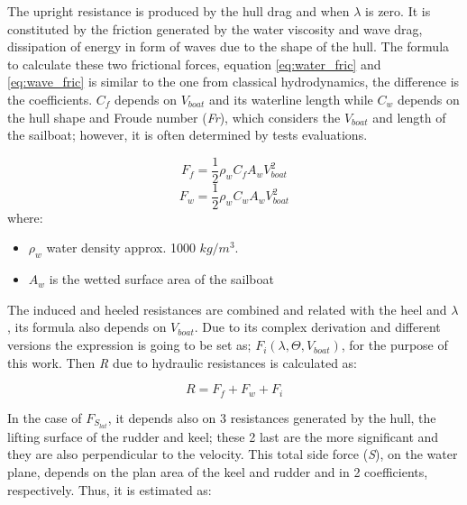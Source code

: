 The upright resistance is produced by the hull drag and when $\lambda$ is zero. It is constituted by the friction generated by the water viscosity and wave drag, dissipation of energy in form of waves due to the shape of the hull. The formula to calculate these two frictional forces, equation \ref{eq:water_fric} and \ref{eq:wave_fric} is similar to the one from classical hydrodynamics, the difference is the coefficients. $C_{f}$ depends on $V_{boat}$ and its waterline length while $C_{w}$ depends on the hull shape and Froude number (\textit{Fr}), which considers the $V_{boat}$ and length of the sailboat; however, it is often determined by tests evaluations.

\begin{equation}\label{eq:water_fric}
 F_{f}=\frac{1}{2}\rho_{w} C_{f} A_{w} V_{boat}^2
\end{equation}
\begin{equation}\label{eq:wave_fric}
 F_{w}=\frac{1}{2}\rho_{w} C_{w} A_{w} V_{boat}^2
\end{equation}
where:
\begin{itemize} \label{R_symbols}
    \item $\rho_{w}$ water density approx. 1000 $kg/m^3$.
    \item $A_{w}$ is the wetted surface area of the sailboat
\end{itemize}

The induced and heeled resistances are combined and related with the heel and $\lambda$, its formula also depends on $V_{boat}$. Due to its complex derivation and different versions the expression is going to be set as; $F_{i}(\lambda,\Theta,V_{boat})$, for the purpose of this work. Then \textit{R} due to hydraulic resistances is calculated as: \par 
\begin{equation} \label{eq:R_total}
    R=F_{f}+F_{w}+F_{i}
\end{equation}


In the case of $F_{S_{lat}}$, it depends also on 3 resistances generated by the hull, the lifting surface of the rudder and keel; these 2 last are the more significant and they are also perpendicular to the velocity. This total side force (\textit{S}), on the water plane, depends on the plan area of the keel and rudder and in 2 coefficients, respectively.  Thus, it is estimated as: \par 

